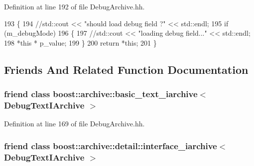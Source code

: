 Definition at line 192 of file Debug\-Archive.\-hh.


\begin{DoxyCode}
193   \{
194     \textcolor{comment}{//std::cout << "should load debug field ?" << std::endl;}
195     \textcolor{keywordflow}{if} (m\_debugMode)
196     \{
197       \textcolor{comment}{//std::cout << "loading debug field..." << std::endl;}
198       *\textcolor{keyword}{this} * p\_value;
199     \}
200     \textcolor{keywordflow}{return} *\textcolor{keyword}{this};
201   \}
\end{DoxyCode}


\subsection{Friends And Related Function Documentation}
\hypertarget{classxtd_1_1serializer_1_1DebugTextIArchive_a6fe2ce7d54600795abdea507c1270a7a}{
\subsubsection[{boost\-::archive\-::basic\-\_\-text\-\_\-iarchive$<$ Debug\-Text\-I\-Archive $>$}]{\setlength{\rightskip}{0pt plus 5cm}friend class boost\-::archive\-::basic\-\_\-text\-\_\-iarchive$<$ {\bf Debug\-Text\-I\-Archive} $>$\hspace{0.3cm}{\ttfamily [friend]}}}\label{classxtd_1_1serializer_1_1DebugTextIArchive_a6fe2ce7d54600795abdea507c1270a7a}


Definition at line 169 of file Debug\-Archive.\-hh.

\hypertarget{classxtd_1_1serializer_1_1DebugTextIArchive_af9e30d7c11da39f8fdf5fd8c21e4e831}{
\subsubsection[{boost\-::archive\-::detail\-::interface\-\_\-iarchive$<$ Debug\-Text\-I\-Archive $>$}]{\setlength{\rightskip}{0pt plus 5cm}friend class boost\-::archive\-::detail\-::interface\-\_\-iarchive$<$ {\bf Debug\-Text\-I\-Archive} $>$\hspace{0.3cm}{\ttfamily [friend]}}}\label{classxtd_1_1serializer_1_1DebugTextIArchive_af9e30d7c11da39f8fdf5fd8c21e4e831}


